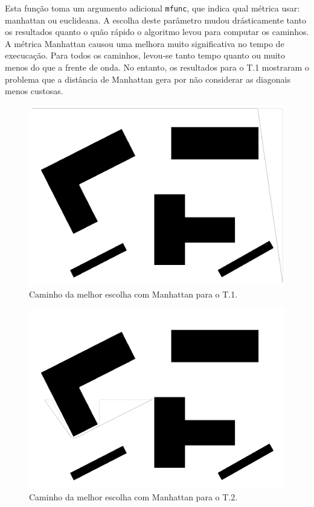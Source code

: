 \documentclass[12pt]{article}
\theoremstyle{plain}
\numberwithin{equation}{section}
\newcommand{\code}[1]{\lstinline[mathescape=true]{#1}}
\begin{document}
Esta função toma um argumento adicional \code{mfunc}, que indica qual métrica usar: manhattan ou
euclideana. A escolha deste parâmetro mudou drásticamente tanto os resultados quanto o quão rápido
o algoritmo levou para computar os caminhos. A métrica Manhattan causou uma melhora muito
significativa no tempo de execucação. Para todos os caminhos, levou-se tanto tempo quanto ou muito
menos do que a frente de onda. No entanto, os resultados para o T.1 mostraram o problema que a
distância de Manhattan gera por não considerar as diagonais menos custosas.


\begin{figure}[H]
  \centering\includegraphics[scale=0.4]{imgs/best_choice_manhattan_1.png}
  \caption{Caminho da melhor escolha com Manhattan para o T.1.}
\end{figure}

\begin{figure}[H]
  \centering\includegraphics[scale=0.4]{imgs/best_choice_manhattan_2.png}
  \caption{Caminho da melhor escolha com Manhattan para o T.2.}
\end{figure}
\end{document}
